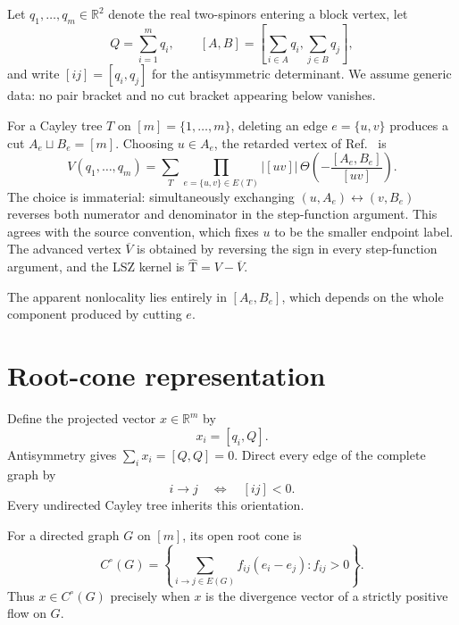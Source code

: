 \documentclass[11pt]{article}
\theoremstyle{definition}
\theoremstyle{remark}
\newcommand{\abs}[1]{\lvert #1\rvert}
\newcommand{\Vbar}{\overline V}
\newcommand{\Mhat}{\widehat{\mathrm T}}
\newcommand{\R}{\mathbb{R}}
\begin{document}
Let $q_1,\ldots,q_m\in\R^2$ denote the real two-spinors entering a block
vertex, let
\begin{equation}
  Q=\sum_{i=1}^m q_i,
  \qquad [A,B]=\left[\sum_{i\in A}q_i,\sum_{j\in B}q_j\right],
\end{equation}
and write $[ij]=[q_i,q_j]$ for the antisymmetric determinant.  We assume
generic data: no pair bracket and no cut bracket appearing below vanishes.

For a Cayley tree $T$ on $[m]=\{1,\ldots,m\}$, deleting an edge
$e=\{u,v\}$ produces a cut $A_e\sqcup B_e=[m]$.  Choosing $u\in A_e$, the
retarded vertex of Ref.~\cite{GuevaraGraviton} is
\begin{equation}\label{eq:publishedV}
  V(q_1,\ldots,q_m)=
  \sum_{T}\prod_{e=\{u,v\}\in E(T)}
  \abs{[uv]}\,
  \Theta\!\left(-\frac{[A_e,B_e]}{[uv]}\right).
\end{equation}
The choice is immaterial: simultaneously exchanging
$(u,A_e)\leftrightarrow(v,B_e)$ reverses both numerator and denominator in the
step-function argument.  This agrees with the source convention, which fixes
$u$ to be the smaller endpoint label.
The advanced vertex $\Vbar$ is obtained by reversing the sign in every
step-function argument, and the LSZ kernel is $\Mhat=V-\Vbar$.

The apparent nonlocality lies entirely in $[A_e,B_e]$, which depends on the
whole component produced by cutting $e$.

\section{Root-cone representation}

Define the projected vector $x\in\R^m$ by
\begin{equation}\label{eq:xdef}
  x_i=[q_i,Q].
\end{equation}
Antisymmetry gives $\sum_i x_i=[Q,Q]=0$.  Direct every edge of the complete
graph by
\begin{equation}\label{eq:orientation}
  i\longrightarrow j \quad\Longleftrightarrow\quad [ij]<0.
\end{equation}
Every undirected Cayley tree inherits this orientation.

For a directed graph $G$ on $[m]$, its open root cone is
\begin{equation}
  C^{\circ}(G)=\left\{
    \sum_{i\to j\in E(G)} f_{ij}(e_i-e_j): f_{ij}>0
  \right\}.
\end{equation}
Thus $x\in C^{\circ}(G)$ precisely when $x$ is the divergence vector of a
strictly positive flow on $G$.
\end{document}
